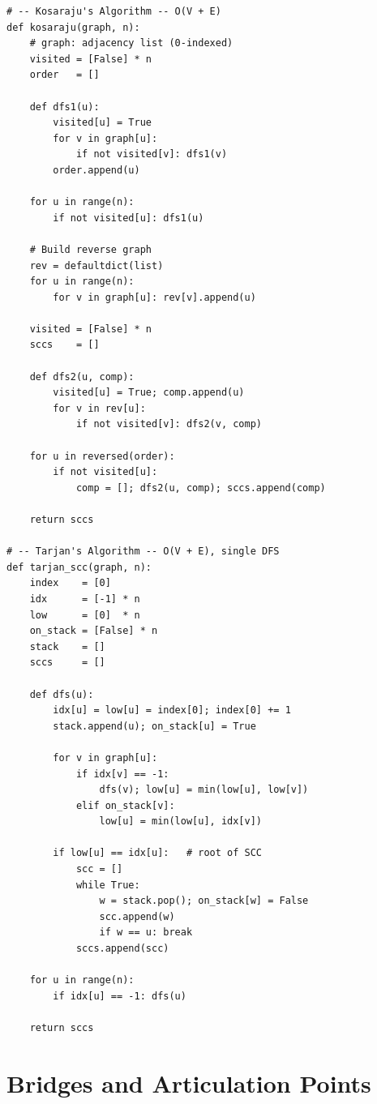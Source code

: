 \documentclass[11pt,a4paper]{report}
\begin{document}
\begin{lstlisting}
# -- Kosaraju's Algorithm -- O(V + E)
def kosaraju(graph, n):
    # graph: adjacency list (0-indexed)
    visited = [False] * n
    order   = []

    def dfs1(u):
        visited[u] = True
        for v in graph[u]:
            if not visited[v]: dfs1(v)
        order.append(u)

    for u in range(n):
        if not visited[u]: dfs1(u)

    # Build reverse graph
    rev = defaultdict(list)
    for u in range(n):
        for v in graph[u]: rev[v].append(u)

    visited = [False] * n
    sccs    = []

    def dfs2(u, comp):
        visited[u] = True; comp.append(u)
        for v in rev[u]:
            if not visited[v]: dfs2(v, comp)

    for u in reversed(order):
        if not visited[u]:
            comp = []; dfs2(u, comp); sccs.append(comp)

    return sccs

# -- Tarjan's Algorithm -- O(V + E), single DFS
def tarjan_scc(graph, n):
    index    = [0]
    idx      = [-1] * n
    low      = [0]  * n
    on_stack = [False] * n
    stack    = []
    sccs     = []

    def dfs(u):
        idx[u] = low[u] = index[0]; index[0] += 1
        stack.append(u); on_stack[u] = True

        for v in graph[u]:
            if idx[v] == -1:
                dfs(v); low[u] = min(low[u], low[v])
            elif on_stack[v]:
                low[u] = min(low[u], idx[v])

        if low[u] == idx[u]:   # root of SCC
            scc = []
            while True:
                w = stack.pop(); on_stack[w] = False
                scc.append(w)
                if w == u: break
            sccs.append(scc)

    for u in range(n):
        if idx[u] == -1: dfs(u)

    return sccs
\end{lstlisting}

\section{Bridges and Articulation Points}
\end{document}
